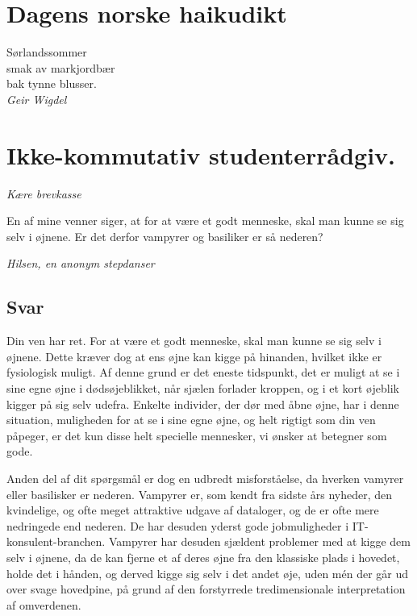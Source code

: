 

\begin{minipage}[b]{0.95\linewidth}
\begin{minipage}[t]{0.47\textwidth}
\vspace{1mm}
\section*{Dagens norske haikudikt}
\begin{center}
Sørlandssommer \\
smak av markjordbær \\
bak tynne blusser. \\
\emph{Geir Wigdel}
\end{center}
 

\section*{Ikke-kommutativ studenterrådgiv.}
\emph{Kære brevkasse}

En af mine venner siger, at for at være et godt menneske, skal man kunne se sig selv i øjnene. Er det derfor vampyrer og basiliker er så nederen?

\emph{Hilsen, en anonym stepdanser}

\subsection*{Svar}

Din ven har ret. For at være et godt menneske, skal man kunne se sig selv i øjnene. Dette kræver dog at ens øjne kan kigge på hinanden, hvilket ikke er fysiologisk muligt. Af denne grund er det eneste tidspunkt, det er muligt at se i sine egne øjne i dødsøjeblikket, når sjælen forlader kroppen, og i et kort øjeblik kigger på sig selv udefra. Enkelte individer, der dør med åbne øjne, har i denne situation, muligheden for at se i sine egne øjne, og helt rigtigt som din ven påpeger, er det kun disse helt specielle mennesker, vi ønsker at betegner som gode. 

Anden del af dit spørgsmål er dog en udbredt misforståelse, da hverken vamyrer eller basilisker er nederen. Vampyrer er, som kendt fra sidste års nyheder, den kvindelige, og ofte meget attraktive udgave af dataloger, og de er ofte mere nedringede end nederen. De har desuden yderst gode jobmuligheder i IT-konsulent-branchen. Vampyrer har desuden sjældent problemer med at kigge dem selv i øjnene, da de kan fjerne et af deres øjne fra den klassiske plads i hovedet, holde det i hånden, og derved kigge sig selv i det andet øje, uden mén der går ud over svage hovedpine, på grund af den forstyrrede tredimensionale interpretation af omverdenen.


\end{minipage}
\end{minipage}
